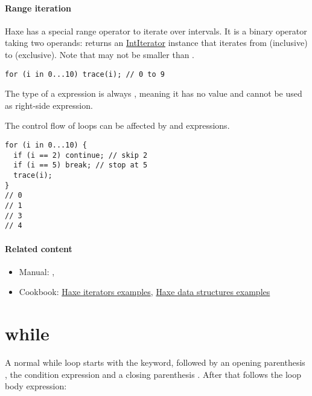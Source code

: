 \paragraph{Range iteration}

Haxe has a special range operator to iterate over intervals. It is a binary operator taking two  operands:  returns an \href{http://api.haxe.org/IntIterator.html}{IntIterator} instance that iterates from  (inclusive) to  (exclusive). Note that  may not be smaller than .

\begin{lstlisting}
for (i in 0...10) trace(i); // 0 to 9
\end{lstlisting}

The type of a  expression is always , meaning it has no value and cannot be used as right-side expression.

The control flow of loops can be affected by  and  expressions.

\begin{lstlisting}
for (i in 0...10) {
  if (i == 2) continue; // skip 2
  if (i == 5) break; // stop at 5
  trace(i);
}
// 0
// 1
// 3
// 4
\end{lstlisting}

\paragraph{Related content}
\begin{itemize}
	\item Manual: , 
	\item Cookbook: \href{http://code.haxe.org/tag/iterator.html}{Haxe iterators examples}, \href{http://code.haxe.org/tag/data-structures.html}{Haxe data structures examples}
\end{itemize}

\section{while}
\label{expression-while}

A normal while loop starts with the  keyword, followed by an opening parenthesis \expr{(}, the condition expression and a closing parenthesis \expr{)}. After that follows the loop body expression:

